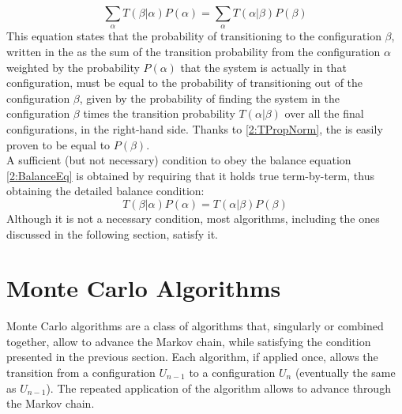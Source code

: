 \begin{equation}
    \sum_\alpha T(\beta|\alpha)P(\alpha) = \sum_\alpha T(\alpha|\beta)P(\beta) \label{2:BalanceEq}
\end{equation}
This equation states that the probability of transitioning to the configuration $\beta$, written in the \lhs as the sum of the transition probability from the configuration $\alpha$ weighted by the probability $P(\alpha)$ that the system is actually in that configuration, must be equal to the probability of transitioning out of the configuration $\beta$, given by the probability of finding the system in the configuration $\beta$ times the transition probability $T(\alpha|\beta)$ over all the final configurations, in the right-hand side.
Thanks to \eqref{2:TPropNorm}, the \rhs is easily proven to be equal to $P(\beta)$.\\
A sufficient (but not necessary) condition to obey the balance equation \eqref{2:BalanceEq} is obtained by requiring that it holds true term-by-term, thus obtaining the detailed balance condition:
\begin{equation}
    T(\beta|\alpha)P(\alpha) = T(\alpha|\beta)P(\beta) \label{2:DetailedBalance}
\end{equation}
Although it is not a necessary condition, most algorithms, including the ones discussed in the following section, satisfy it.

\section{Monte Carlo Algorithms}
Monte Carlo algorithms are a class of algorithms that, singularly or combined together, allow to advance the Markov chain, while satisfying the condition presented in the previous section.
Each algorithm, if applied once, allows the transition from a configuration $U_{n-1}$ to a configuration $U_n$ (eventually the same as $U_{n-1}$). The repeated application of the algorithm allows to advance through the Markov chain.

